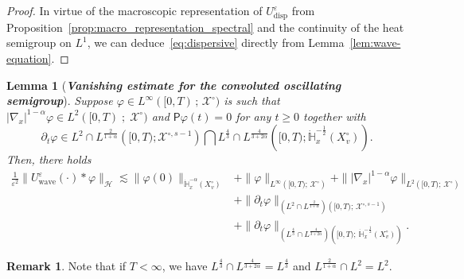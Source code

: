 \documentclass[10pt]{amsart}
\newtheorem{lemm}[theo]{Lemma}\newtheorem{prop}[theo]{Proposition}\newtheorem{coro}[theo]{Corollary}\newtheorem{conj}[theo]{Conjecture}
\theoremstyle{definition}\newtheorem{defi}[theo]{Definition}\newtheorem{rema}[theo]{Remark}\newtheorem{exam}[theo]{Example}\newtheorem{exem}[theo]{Example}\newtheorem{nota}[theo]{Notation}
\newcommand{\Wave}{\mathrm{wave}}
\newcommand{\disp}{\mathrm{disp}}
\newcommand{\bbH}{\mathbb{H}}
\newcommand{\XX}{\mathcal{X}}
\newcommand{\PP}{\mathsf{P}}
\newcommand{\HHH}{\mathscr{H}}
\newcommand{\SSSs}{\HHH}
\newcommand{\Slm}{X^{\circ}}
\newcommand{\SSlm}{\XX^{\circ}}
\newcommand{\rSSlm}[1]{\XX^{{\circ}, #1}}
\renewcommand*\ge{\geqslant}
\newcommand*\eps{{\varepsilon}}
\begin{document}
\begin{proof}
In virtue of the macroscopic representation of $U^\eps_\disp$ from Proposition~\ref{prop:macro_representation_spectral} and the continuity of the heat semigroup on $L^1$, we can deduce~\eqref{eq:dispersive} directly from Lemma~\ref{lem:wave-equation}.
\end{proof}

\begin{lemm}[\emph{\textbf{Vanishing estimate for the convoluted oscillating semigroup}}]\label{lem:convolution_wave}
Suppose $\varphi \in L^{\infty}([0,T)\,;\,\SSlm)$ is such that $|\nabla_{x}|^{1-\alpha}\varphi \in L^{2}([0,T)\;;\;\SSlm)$ and $\PP \varphi(t) = 0$ for any $t\ge0$ together with
\[
\partial_t\varphi \in L^2 \cap L^{ \frac{2}{1+\alpha} } \left([0, T) ; \rSSlm{s-1}\right) \bigcap L^{\frac{4}{3}} \cap L^{\frac{4}{3 + 2 \alpha}} \left([0, T) ; \dot{\bbH}^{-\frac{1}{2}}_x \left(\Slm_v\right) \right).
\]
Then, there holds
\begin{align*}
\frac{1}{\eps^2} \| U^\eps_\Wave(\cdot) * \varphi \|_{\SSSs} \lesssim \| \varphi(0) \|_{ \dot{\bbH}^{-\alpha}_x \left(\Slm_v \right) } & + \| \varphi \|_{ L^\infty \left([0, T);\,\SSlm \right) } + \| | \nabla_x|^{1 - \alpha} \varphi \|_{ L^2 \left([0, T);\,\SSlm \right) } \\
& + \| \partial_t \varphi \|_{ \left(L^2 \cap L^{ \frac{2}{1+\alpha} }\right) \left([0, T);\,\rSSlm{s-1} \right) } \\
& + \| \partial_t \varphi \|_{ \left(L^{ \frac{4}{3} } \cap L^{\frac{4}{3 + 2 \alpha}}\right) \left([0, T);\, \dot{\bbH}^{-\frac{1}{2}}_x \left(\Slm_v\right) \right) }.
\end{align*}
\end{lemm}

\begin{rema}
Note that if $T < \infty$, we have $L^{\frac{4}{3}} \cap L^{\frac{4}{3+2\alpha}}=L^{\frac{4}{3}}$ and $L^{\frac{2}{1+\alpha}}\cap L^2=L^2$.
\end{rema}
\end{document}
